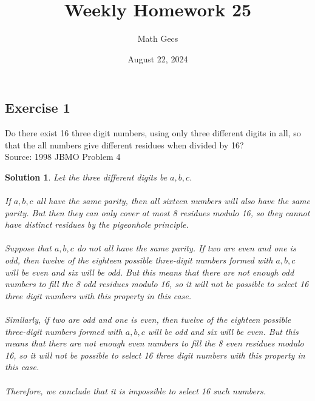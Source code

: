 \documentclass[12pt]{article}
\title{Weekly Homework 25}
\author{Math Gecs}
\date{August 22, 2024}
\newtheorem*{solution*}{Solution}
\begin{document}
\maketitle

\subsection*{Exercise 1}
Do there exist 16 three digit numbers, using only three different digits in all, so that the all numbers give different residues when divided by 16?\\

Source: 1998 JBMO Problem 4\\


\begin{solution*}
Let the three different digits be $a, b, c$.
\\ \\
If $a, b, c$ all have the same parity, then all sixteen numbers will also have the same parity. But then they can only cover at most 8 residues modulo 16, so they cannot have distinct residues by the pigeonhole principle.
\\ \\
Suppose that $a, b, c$ do not all have the same parity. If two are even and one is odd, then twelve of the eighteen possible three-digit numbers formed with $a, b, c$ will be even and six will be odd. But this means that there are not enough odd numbers to fill the 8 odd residues modulo 16, so it will not be possible to select 16 three digit numbers with this property in this case.
\\ \\
Similarly, if two are odd and one is even, then twelve of the eighteen possible three-digit numbers formed with $a, b, c$ will be odd and six will be even. But this means that there are not enough even numbers to fill the 8 even residues modulo 16, so it will not be possible to select 16 three digit numbers with this property in this case.
\\ \\
Therefore, we conclude that it is impossible to select 16 such numbers.
\end{solution*}
\end{document}
